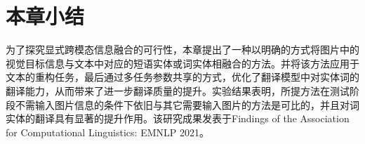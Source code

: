 






\section{本章小结}
为了探究显式跨模态信息融合的可行性，本章提出了一种以明确的方式将图片中的视觉目标信息与文本中对应的短语实体或词实体相融合的方法。并将该方法应用于文本的重构任务，最后通过多任务参数共享的方式，优化了翻译模型中对实体词的翻译能力，从而带来了进一步翻译质量的提升。实验结果表明，所提方法在测试阶段不需输入图片信息的条件下依旧与其它需要输入图片的方法是可比的，并且对词实体的翻译具有显著的提升作用。该研究成果发表于Findings of the Association for Computational Linguistics: EMNLP 2021。